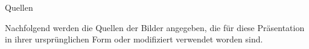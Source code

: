 %
%
%
%



\begin{frame}[allowframebreaks]{Quellen}
 
  
  Nachfolgend werden die Quellen der Bilder angegeben, 
  die für diese Präsentation in ihrer ursprünglichen Form oder modifiziert verwendet worden sind.

  \nocite{*}

  {\tiny 
%  
    \printbibliography %
  }

\end{frame}